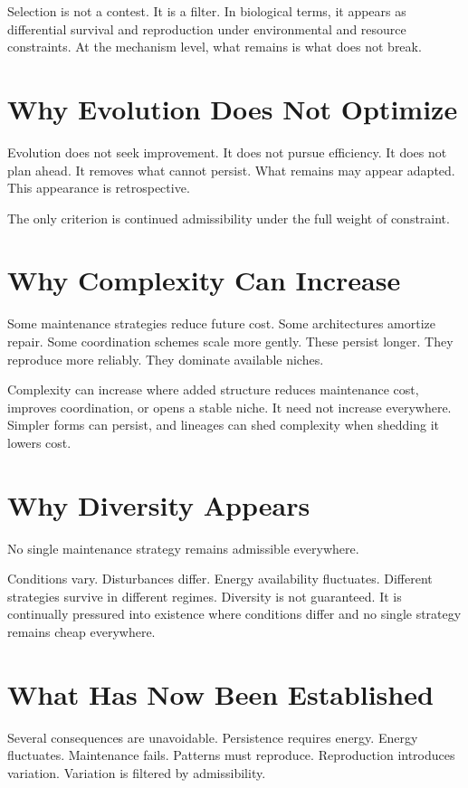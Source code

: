 \documentclass[11pt,twoside,openright]{book}
\begin{document}
Selection is not a contest. It is a filter. In biological terms, it appears as differential survival and reproduction under environmental and resource constraints. At the mechanism level, what remains is what does not break.

\section*{Why Evolution Does Not Optimize}

Evolution does not seek improvement. It does not pursue efficiency. It does not plan ahead. It removes what cannot persist. What remains may appear adapted. This appearance is retrospective.

The only criterion is continued admissibility under the full weight of constraint.

\section*{Why Complexity Can Increase}

Some maintenance strategies reduce future cost. Some architectures amortize repair. Some coordination schemes scale more gently. These persist longer. They reproduce more reliably. They dominate available niches.

Complexity can increase where added structure reduces maintenance cost, improves coordination, or opens a stable niche. It need not increase everywhere. Simpler forms can persist, and lineages can shed complexity when shedding it lowers cost.

\section*{Why Diversity Appears}

No single maintenance strategy remains admissible everywhere.

Conditions vary. Disturbances differ. Energy availability fluctuates. Different strategies survive in different regimes. Diversity is not guaranteed. It is continually pressured into existence where conditions differ and no single strategy remains cheap everywhere.

\section*{What Has Now Been Established}

Several consequences are unavoidable. Persistence requires energy. Energy fluctuates. Maintenance fails. Patterns must reproduce. Reproduction introduces variation. Variation is filtered by admissibility.
\end{document}

